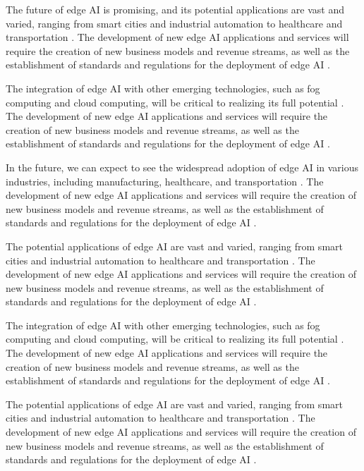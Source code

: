 \documentclass[11pt,a4paper]{article}
\begin{document}
The future of edge AI is promising, and its potential applications are vast and varied, ranging from smart cities and industrial automation to healthcare and transportation \cite{arxiv:2309.03420}. The development of new edge AI applications and services will require the creation of new business models and revenue streams, as well as the establishment of standards and regulations for the deployment of edge AI \cite{arxiv:2403.19729}. 

The integration of edge AI with other emerging technologies, such as fog computing and cloud computing, will be critical to realizing its full potential \cite{arxiv:2510.10166}. The development of new edge AI applications and services will require the creation of new business models and revenue streams, as well as the establishment of standards and regulations for the deployment of edge AI \cite{arxiv:2501.14823}. 

In the future, we can expect to see the widespread adoption of edge AI in various industries, including manufacturing, healthcare, and transportation \cite{arxiv:2502.15775}. The development of new edge AI applications and services will require the creation of new business models and revenue streams, as well as the establishment of standards and regulations for the deployment of edge AI \cite{arxiv:2403.15665}. 

The potential applications of edge AI are vast and varied, ranging from smart cities and industrial automation to healthcare and transportation \cite{arxiv:2402.13056}. The development of new edge AI applications and services will require the creation of new business models and revenue streams, as well as the establishment of standards and regulations for the deployment of edge AI \cite{arxiv:2309.05416}. 

The integration of edge AI with other emerging technologies, such as fog computing and cloud computing, will be critical to realizing its full potential \cite{arxiv:2404.13411}. The development of new edge AI applications and services will require the creation of new business models and revenue streams, as well as the establishment of standards and regulations for the deployment of edge AI \cite{arxiv:1906.08452}. 

The potential applications of edge AI are vast and varied, ranging from smart cities and industrial automation to healthcare and transportation \cite{arxiv:2201.00242}. The development of new edge AI applications and services will require the creation of new business models and revenue streams, as well as the establishment of standards and regulations for the deployment of edge AI \cite{arxiv:1909.08747}. 
\end{document}
